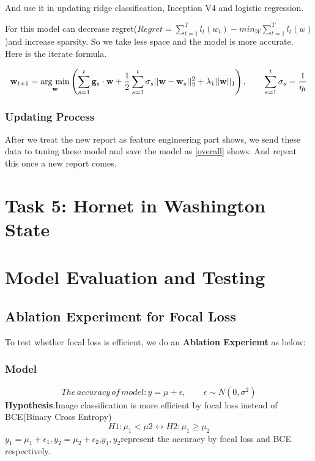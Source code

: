\documentclass[12pt]{article}
\begin{document}
And use it in updating ridge classification, Inception V4 and logistic regression.

For this model can decrease regret($Regret=\sum_{t=1}^T l_t(w_t)-min_{W}\sum_{t=1}^Tl_t(w)$)and increase sparsity. So  we take less space and the model is more accurate. Here is the iterate formula.



\begin{equation}\mathbf{w}_{t+1} = \underset{\rm \mathbf{w}}{\rm arg\ min}\left(\displaystyle\sum_{s=1}^t {\mathbf{g}_s \cdot \mathbf{w}} + \frac 12 \displaystyle\sum_{s=1}^t {\sigma_s||\mathbf{w} - \mathbf{w}_s||_2^2} + \lambda_1||\mathbf{w}||_1\right),\qquad \sum_{s=1}^t \sigma_s = \frac 1{\eta_t}\end{equation}

\subsubsection{Updating Process}
After we treat the new report as feature engineering part shows, we send these data to tuning these model and save the model as \ref{overall} shows. And repeat this once a new report comes.



\section{Task 5: Hornet in Washington State}



\section{Model Evaluation and Testing}
\subsection{Ablation Experiment for Focal Loss }
To test whether focal loss is efficient, we do an \textbf{Ablation Experiemt }as below:
\subsubsection{Model}
\begin{equation*}
The\,accuracy\,of\,model:y=\mu+\epsilon,\qquad \epsilon\sim N(0,\sigma^2)
\end{equation*}
\textbf{Hypothesis}:Image classification is more efficient by focal loss instead of BCE(Binary Cross Entropy)
\begin{equation*}
H1:\mu_1<\mu2\leftrightarrow H2:\mu_1\geq \mu_2
\end{equation*}
$y_1=\mu_1+\epsilon_1,y_2=\mu_2+\epsilon_2$,$y_1,y_2$represent the accuracy by focal loss and BCE respectively.
\end{document}

